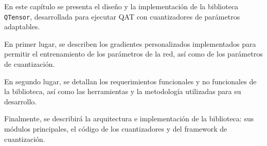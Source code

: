 En este capítulo se presenta el diseño y la implementación de la biblioteca \texttt{QTensor}, desarrollada para ejecutar QAT con cuantizadores de parámetros adaptables.

En primer lugar, se describen los gradientes personalizados implementados para permitir el entrenamiento de los parámetros de la red, así como de los parámetros de cuantización.

En segundo lugar, se detallan los requerimientos funcionales y no funcionales de la biblioteca, así como las herramientas y la metodología utilizadas para su desarrollo.

Finalmente, se describirá la arquitectura e implementación de la biblioteca: sus módulos principales, el código de los cuantizadores y del framework de cuantización.



